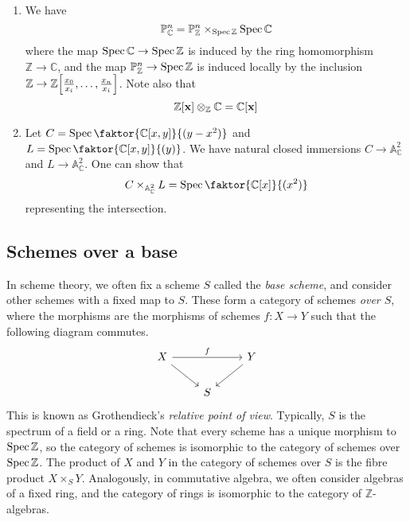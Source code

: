 \begin{example}
    \begin{enumerate}
        \item We have
        \[ \mathbb P^n_{\mathbb C} = \mathbb P^n_{\mathbb Z} \times_{\operatorname{Spec} \mathbb Z} \operatorname{Spec} \mathbb C \]
        where the map \( \operatorname{Spec} \mathbb C \to \operatorname{Spec} \mathbb Z \) is induced by the ring homomorphism \( \mathbb Z \to \mathbb C \), and the map \( \mathbb P^n_{\mathbb Z} \to \operatorname{Spec} \mathbb Z \) is induced locally by the inclusion \( \mathbb Z \to \mathbb Z\qty[\frac{x_0}{x_i}, \dots, \frac{x_n}{x_i}] \).
        Note also that
        \[ \mathbb Z[\vb x] \otimes_{\mathbb Z} \mathbb C = \mathbb C[\vb x] \]
        \item Let \( C = \Spec \faktor{\mathbb C[x, y]}{(y - x^2)} \) and \( L = \Spec \faktor{\mathbb C[x, y]}{(y)} \).
        We have natural closed immersions \( C \to \mathbb A^2_{\mathbb C} \) and \( L \to \mathbb A^2_{\mathbb C} \).
        One can show that
        \[ C \times_{\mathbb A^2_{\mathbb C}} L = \Spec \faktor{\mathbb C[x]}{(x^2)} \]
        representing the intersection.
    \end{enumerate}
\end{example}

\subsection{Schemes over a base}
In scheme theory, we often fix a scheme \( S \) called the \emph{base scheme}, and consider other schemes with a fixed map to \( S \).
These form a category of schemes \emph{over \( S \)}, where the morphisms are the morphisms of schemes \( f : X \to Y \) such that the following diagram commutes.
\[\begin{tikzcd}
	X && Y \\
	& S
	\arrow[from=1-1, to=2-2]
	\arrow["f", from=1-1, to=1-3]
	\arrow[from=1-3, to=2-2]
\end{tikzcd}\]
This is known as Grothendieck's \emph{relative point of view}.
Typically, \( S \) is the spectrum of a field or a ring.
Note that every scheme has a unique morphism to \( \operatorname{Spec} \mathbb Z \), so the category of schemes is isomorphic to the category of schemes over \( \operatorname{Spec} \mathbb Z \).
The product of \( X \) and \( Y \) in the category of schemes over \( S \) is the fibre product \( X \times_S Y \).
Analogously, in commutative algebra, we often consider algebras of a fixed ring, and the category of rings is isomorphic to the category of \( \mathbb Z \)-algebras.

